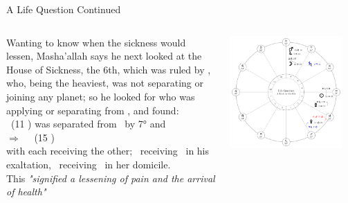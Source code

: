 \begin{frame}[t]{A Life Question Continued}
\begin{columns}[T, onlytextwidth]
Wanting to know when the sickness would lessen, Masha'allah says he next looked at the House of Sickness, the 6th, which was ruled by \Saturn, who, being the heaviest, was not separating or joining any planet; so he looked for who was applying or separating from \Saturn, and found: \\

\vspace{0.25cm}
\Venus\ (11 \Capricorn) was separated from \Saturn\ by 7° and \\
\hspace{1em}$\Rightarrow$ \Trine\ \Mars\ (15 \Taurus) \\ 
with each receiving the other; \Mars\ receiving \Venus\ in his exaltation, \Venus\ receiving \Mars\ in her domicile.\\

\vspace{0.25cm}
This \textsl{"signified a lessening of pain and the arrival of health"}
\begin{center}
{\includegraphics[width=0.9\textwidth]{charts/22a-chart-life}}
\end{center}
\end{columns}
\end{frame}